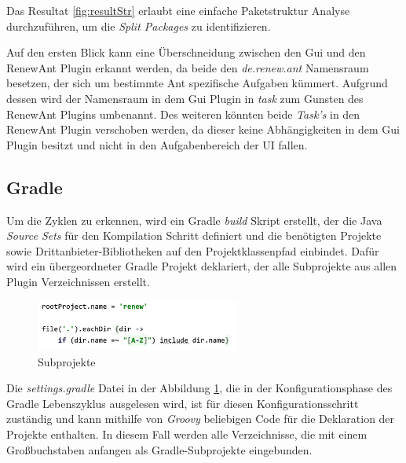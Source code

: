 	Das Resultat \ref{fig:resultStr} erlaubt eine einfache Paketstruktur Analyse durchzuführen, um die \textit{Split Packages} zu identifizieren. \newline


	Auf den ersten Blick kann eine Überschneidung zwischen den Gui und den RenewAnt Plugin erkannt werden, da beide den \textit{de.renew.ant} Namensraum besetzen, der sich um bestimmte Ant spezifische Aufgaben kümmert. Aufgrund dessen wird der Namensraum in dem Gui Plugin in \textit{task} zum Gunsten des RenewAnt Plugins umbenannt. Des weiteren könnten beide \textit{Task's} in den RenewAnt Plugin verschoben werden, da dieser keine Abhängigkeiten in dem Gui Plugin besitzt und nicht in den Aufgabenbereich der UI fallen. 

\subsection{Gradle}

 	Um die Zyklen zu erkennen, wird ein Gradle \textit{build} Skript erstellt, der die Java \textit{Source Sets} für den Kompilation Schritt definiert und die benötigten Projekte sowie Drittanbieter-Bibliotheken auf den Projektklassenpfad einbindet. Dafür wird ein übergeordneter Gradle Projekt deklariert, der alle Subprojekte aus allen Plugin Verzeichnissen erstellt. \bigbreak

	\begin{figure}[h!]
	  \centering
	  \includegraphics[width=0.6\textwidth]{material/images/settings_gradle.png}
	  \caption{Subprojekte}
	  \label{fig:subprojekte}
	\end{figure}

 	Die \textit{settings.gradle} Datei in der Abbildung \ref{fig:subprojekte}, die in der Konfigurationsphase des Gradle Lebenszyklus ausgelesen wird, ist für diesen Konfigurationsschritt zuständig und kann mithilfe von \textit{Groovy} beliebigen Code für die Deklaration der Projekte enthalten. In diesem Fall werden alle Verzeichnisse, die mit einem Großbuchstaben anfangen als Gradle-Subprojekte eingebunden.\bigbreak

